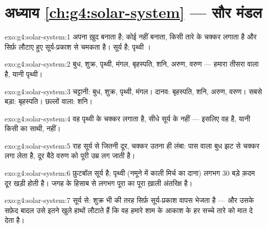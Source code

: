\section*{अध्याय \ref{ch:g4:solar-system} --- सौर मंडल}

\begin{solution}{exo:g4:solar-system:1}
 अपना  ख़ुद बनाता है;  कोई  नहीं बनाता, किसी तारे
के चक्कर लगाता है और सिर्फ़ लौटाए हुए सूर्य-प्रकाश से चमकता है।
सूर्य  है; पृथ्वी ।
\end{solution}

\begin{solution}{exo:g4:solar-system:2}
बुध, शुक्र, पृथ्वी, मंगल, बृहस्पति, शनि, अरुण, वरुण --- हमारा तीसरा
वाला है, यानी पृथ्वी।
\end{solution}

\begin{solution}{exo:g4:solar-system:3}
चट्टानी: बुध, शुक्र, पृथ्वी, मंगल। दानव: बृहस्पति, शनि, अरुण, वरुण।
सबसे बड़ा: बृहस्पति। छल्लों वाला: शनि।
\end{solution}

\begin{solution}{exo:g4:solar-system:4}
वह पृथ्वी के चक्कर लगाता है, सीधे सूर्य के नहीं --- इसलिए वह 
है, यानी किसी  का साथी,  नहीं।
\end{solution}

\begin{solution}{exo:g4:solar-system:5}
राह सूर्य से जितनी दूर, चक्कर उतना ही लंबा: पास वाला बुध झट से चक्कर
लगा लेता है, दूर बैठे वरुण को पूरी उम्र लग जाती है।
\end{solution}

\begin{solution}{exo:g4:solar-system:6}
फ़ुटबॉल सूर्य है; पृथ्वी (नमूने में काली मिर्च का दाना) लगभग $30$
बड़े क़दम दूर खड़ी होती है। जगह के हिसाब से  लगभग पूरा का
पूरा ख़ाली अंतरिक्ष है।
\end{solution}

\begin{solution}{exo:g4:solar-system:7}
सूर्य से: शुक्र भी  की तरह सिर्फ़ सूर्य-प्रकाश वापस भेजता है
--- और उसके सफ़ेद बादल उसे इतने खुले हाथों लौटाते हैं कि वह हमारे
शाम के आकाश के हर सच्चे तारे को मात दे देता है।
\end{solution}

